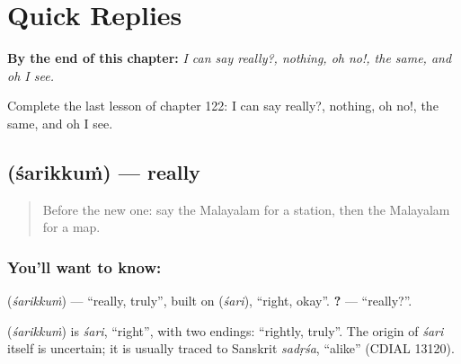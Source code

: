 
\chapter{Quick Replies}
\label{ch:ml-quick-replies}

\begin{chapteropening}
\textbf{By the end of this chapter:} \emph{I can say really?, nothing, oh no!, the same, and oh I see.}

Complete the last lesson of chapter 122: I can say really?, nothing, oh no!, the same, and oh I see.
\end{chapteropening}

\section[\texorpdfstring{\ml{ശരിക്കും} (śarikkuṁ)}{ശരിക്കും (śarikkuṁ)}]{ (śarikkuṁ) — really}

\label{lesson:ML-C122-really}



\begin{quote}
Before the new one: say the Malayalam for a station, then the Malayalam for a map.
\end{quote}

\subsection*{You'll want to know: }
\textbf{} (\emph{śarikkuṁ}) — \textquotedblleft{}really, truly\textquotedblright{}, built on \textbf{} (\emph{śari}), \textquotedblleft{}right, okay\textquotedblright{}. \textbf{?} — \textquotedblleft{}really?\textquotedblright{}.

\begin{cousinweb}
\textbf{} (\emph{śarikkuṁ}) is \emph{śari}, \textquotedblleft{}right\textquotedblright{}, with two endings: \textquotedblleft{}rightly, truly\textquotedblright{}. The origin of \emph{śari} itself is uncertain; it is usually traced to Sanskrit \emph{sadṛśa}, \textquotedblleft{}alike\textquotedblright{} (CDIAL 13120).
\end{cousinweb}

